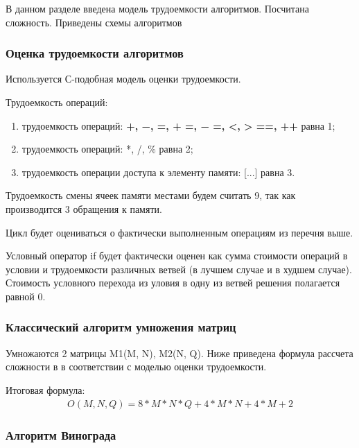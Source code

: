 \documentclass[../main.tex]{subfiles}
\begin{document}
	В данном разделе введена модель трудоемкости алгоритмов. Посчитана сложность. Приведены схемы алгоритмов
	
\subsubsection{Оценка трудоемкости алгоритмов}

	Используется С-подобная модель оценки трудоемкости.
	
	Трудоемкость операций:
	\begin{enumerate}[1)]
		\item трудоемкость операций: \textbf{+, −, =, + =, − =, <, > ==, ++} равна 1;
		\item трудоемкость операций: *, /, \% равна 2;
		\item трудоемкость операции доступа к элементу памяти: [...] равна 3.
	\end{enumerate}

	Трудоемкость смены ячеек памяти местами будем считать 9, так как производится 3 обращения к памяти.
	
	Цикл будет оцениваться о фактически выполненным операциям из перечня выше.
	
	Условный оператор if будет фактически оценен как сумма стоимости операций в условии и трудоемкости различных ветвей (в лучшем случае и в худшем случае). 
	Стоимость условного перехода из уловия в одну из ветвей решения полагается равной 0.
	
\subsubsection{Классический алгоритм умножения матриц}

	Умножаются 2 матрицы M1(M, N), M2(N, Q). Ниже приведена формула рассчета сложности в в соответствии с моделью оценки трудоемкости.
	
	Итоговая формула: \\

	\begin{equation}
	\boxed{\begin{aligned}
		O(M, N, Q) = 8 * M * N * Q + 4 * M * N + 4 * M + 2
	\end{aligned}}
	\end{equation}

\subsubsection{Алгоритм Винограда}
	
\end{document}
